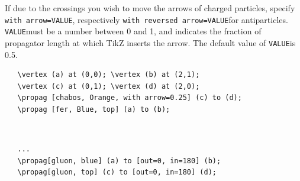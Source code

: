 \documentclass[10pt,letterpaper,twoside,notitlepage]{article}
\numberwithin{figure}{section}
\begin{document}
If due to the crossings you wish to move the arrows of charged particles,
specify \blucol\verb$with arrow=VALUE$\txcol,
respectively \blucol\verb$with reversed arrow=VALUE$\txcol for antiparticles.
\blucol\verb$VALUE$\txcol must be a number between 0 and 1,
and indicates the fraction of propagator length at which TikZ inserts the arrow.
The default value of \blucol\verb$VALUE$\txcol is 0.5.
\vspace{-1mm}\\
%
\begin{minipage}{0.8\linewidth}
\blucol\begin{verbatim}
   \vertex (a) at (0,0); \vertex (b) at (2,1);
   \vertex (c) at (0,1); \vertex (d) at (2,0);
   \propag [chabos, Orange, with arrow=0.25] (c) to (d);
   \propag [fer, Blue, top] (a) to (b);
\end{verbatim}\txcol
\end{minipage}
%
\begin{minipage}{0.15\linewidth}
\end{minipage}
\vspace{-5mm}
\\
%
\begin{minipage}{0.8\linewidth}
\blucol\begin{verbatim}
   ...
   \propag[gluon, blue] (a) to [out=0, in=180] (b);
   \propag[gluon, top] (c) to [out=0, in=180] (d);
\end{verbatim}\txcol
\end{minipage}
%
\begin{minipage}{0.15\linewidth}
\end{minipage}
\vspace{-3mm}
%
%
%
\end{document}
